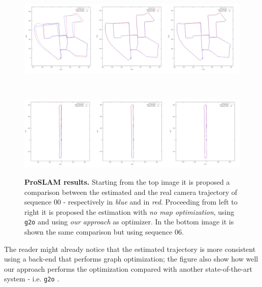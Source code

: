 \begin{figure}[!hbt]
    \centering
    \begin{minipage}[t!]{0.9\textwidth}
        \centering
        \includegraphics[width=\textwidth]{figures/06_use_cases/00_froslam.png}
        \label{fig:froslam_kitti_00}
    \end{minipage}\\
    \begin{minipage}[t!]{0.9\textwidth}
        \centering
        \includegraphics[width=\textwidth]{figures/06_use_cases/06_froslam.png}
        \label{fig:froslam_kitti_06}
    \end{minipage}%
    
    \caption{\textbf{ProSLAM results.} Starting from the top image it is proposed a comparison between the estimated and the real camera trajectory of sequence 00 - respectively in \textit{blue} and in \textit{red}. Proceeding from left to right it is proposed the estimation with \textit{no map optimization}, using \texttt{g2o} and using \textit{our approach} as optimizer. In the bottom image it is shown the same comparison but using sequence 06.} 
    \label{fig:froslam_kitti}
\end{figure}

\noindent The reader might already notice that the estimated trajectory is more consistent using a back-end that performs graph optimization; the figure also show how well our approach performs the optimization compared with another state-of-the-art system - i.e. \texttt{g2o} \cite{kummerle2011g}.

